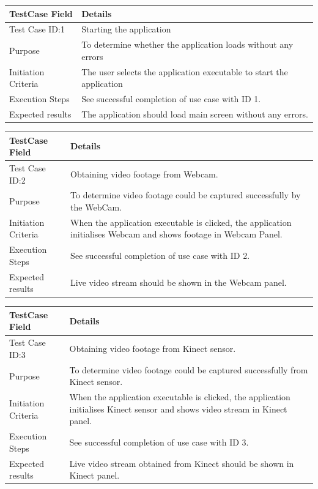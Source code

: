 \documentclass[a4paper, 12pt]{article}
\begin{document}
\begin{table}[!htb]
 \begin{tabular}{|p{4cm}|p{10cm}|}
 \hline
  TestCase Field & Details \\
  \hline
   Test Case ID:1 & Starting the application  \\
  \hline 
   Purpose & To determine whether the application loads without any errors  \\
  \hline
   Initiation Criteria & The user selects the application executable to start the application  \\
  \hline
   Execution Steps & See successful completion of use case with ID 1.  \\
  \hline
   Expected results & The application should load main screen without any errors.  \\
  \hline
 \end{tabular}
\end{table}

\begin{table}[!htb]
 \begin{tabular}{|p{4cm}|p{10cm}|}
 \hline
  TestCase Field & Details \\
  \hline
   Test Case ID:2 & Obtaining video footage from Webcam.  \\
  \hline 
   Purpose & To determine video footage could be captured successfully by the WebCam.  \\
  \hline
   Initiation Criteria & When the application executable is clicked, the application initialises Webcam and shows footage in Webcam Panel.  \\
  \hline
   Execution Steps & See successful completion of use case with ID 2.  \\
  \hline
   Expected results & Live video stream should be shown in the Webcam panel.  \\
  \hline
 \end{tabular}
 \end{table}
 
\begin{table}[!htb]
 \begin{tabular}{|p{4cm}|p{10cm}|}
 \hline
  TestCase Field & Details \\
  \hline
   Test Case ID:3 & Obtaining video footage from Kinect sensor.  \\
  \hline 
   Purpose & To determine video footage could be captured successfully from Kinect sensor.  \\
  \hline
   Initiation Criteria & When the application executable is clicked, the application initialises Kinect sensor and shows video stream in Kinect panel.  \\
  \hline
   Execution Steps & See successful completion of use case with ID 3.  \\
  \hline
   Expected results & Live video stream  obtained from Kinect should be shown in Kinect panel.  \\
  \hline
 \end{tabular}
\end{table}
 
\end{document}
